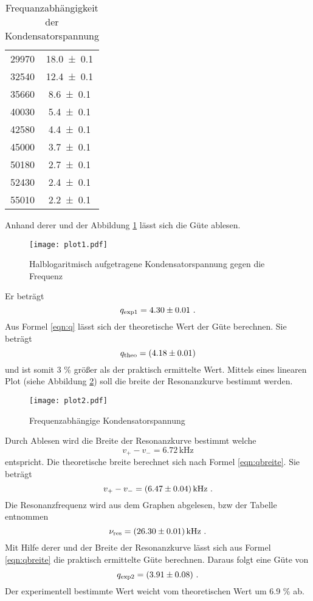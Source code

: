 \begin{table}
\begin{tabular}{c c}
	29970	& \num{18.0 +- 0.1}	\\
	32540	& \num{12.4 +- 0.1}	\\
	35660	& \num{8.6 +- 0.1}	\\
	40030 	& \num{5.4 +- 0.1}	\\
	42580 	& \num{4.4 +- 0.1}	\\
	45000	& \num{3.7 +- 0.1}	\\
	50180	& \num{2.7 +- 0.1}	\\
	52430 	& \num{2.4 +- 0.1}	\\
	55010	& \num{2.2 +- 0.1}	\\
	\bottomrule
 	\end{tabular}
  \caption{Frequanzabhängigkeit der Kondensatorspannung}
  \label{tab:U_c}
\end{table}
Anhand derer und der Abbildung \ref{fig:logUc} lässt sich die Güte ablesen.
\begin{figure}
  \centering
  \texttt{[image: plot1.pdf]}
  \caption{Halblogaritmisch aufgetragene Kondensatorspannung gegen die Frequenz}
  \label{fig:logUc}
\end{figure}
Er beträgt
\begin{equation}
  q_\text{exp1} = \num{4.30 +- 0.01} \ .
  \label{eqn:qexp}
\end{equation}
Aus Formel \ref{eqn:q} lässt sich der theoretische Wert der Güte berechnen. Sie beträgt
\begin{equation}
  q_\text{theo} = (\num{4.18 +- 0.01})
  \label{eqn:qtheo}
\end{equation}
und ist somit 3 \% größer als der praktisch ermittelte Wert. Mittels eines linearen Plot (siehe Abbildung \ref{fig:fUc}) soll die breite der Resonanzkurve bestimmt werden.
\begin{figure}
  \centering
  \texttt{[image: plot2.pdf]}
  \caption{Frequenzabhängige Kondensatorspannung}
  \label{fig:fUc}
\end{figure}
Durch Ablesen wird die Breite der Resonanzkurve bestimmt welche
\begin{equation}
  v_+ - v_- = 6.72 \, \text{kHz}
\end{equation}
entspricht. Die theoretische breite berechnet sich nach Formel \ref{eqn:qbreite}. Sie beträgt
\begin{equation}
	v_+ - v_- = (\num{6.47 +- 0.04}) \, \text{kHz} \ .
	\label{eqn:nures}
\end{equation}
Die Resonanzfrequenz wird aus dem Graphen abgelesen, bzw der Tabelle entnommen
\begin{equation}
  \nu_\text{res} = (\num{26.30 +- 0.01}) \, \text{kHz} \ .
\end{equation}
Mit Hilfe derer und der Breite der Resonanzkurve lässt sich aus Formel \ref{eqn:qbreite} die praktisch ermittelte Güte berechnen. Daraus folgt eine Güte von
\begin{equation}
  q_\text{exp2} = (\num{3.91 +- 0.08}) \ .
  \label{eqn:qexp2}
\end{equation}
Der experimentell bestimmte Wert weicht vom theoretischen Wert um 6.9 \% ab.
